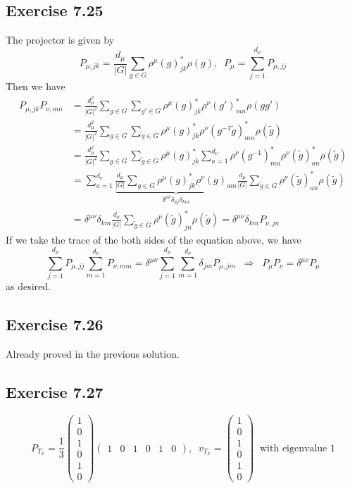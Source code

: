 \documentclass[]{ctexart}
\begin{document}
\subsection{Exercise 7.25} 
The projector is given by 
\begin{equation*}
P_{\mu,jk}=\frac{d_\mu}{|G|}\sum_{g\in G}\rho^\mu(g)^*_{jk}\rho(g),\;\;P_\mu=\sum_{j=1}^{d_\mu}P_{\mu,jj}
\end{equation*}
Then we have 
\begin{align*}
P_{\mu,jk}P_{\nu,mn}&=\frac{d_\mu^2}{|G|^2}\sum_{g\in G}\sum_{g'\in G}\rho^\mu(g)^*_{jk}\rho^\nu(g')^*_{mn}\rho(gg')\\
&=\frac{d_\mu^2}{|G|^2}\sum_{g\in G}\sum_{\tilde{g}\in G}\rho^\mu(g)^*_{jk}\rho^\nu(g^{-1}\tilde{g})^*_{mn}\rho(\tilde{g})\\
&=\frac{d_\mu^2}{|G|^2}\sum_{g\in G}\sum_{\tilde{g}\in G}\rho^\mu(g)^*_{jk}\sum_{a=1}^{d_\nu}\rho^\nu(g^{-1})^*_{ma}\rho^\nu(\tilde{g})^*_{an}\rho(\tilde{g})\\
&=\sum_{a=1}^{d_\nu}\underbrace{\frac{d_\mu}{|G|}\sum_{g\in G}\rho^\mu(g)^*_{jk}\rho^\nu(g)_{am}}_{\delta^{\mu\nu}\delta_{aj}\delta_{km}}\frac{d_\mu}{|G|}\sum_{\tilde{g}\in G}\rho^\nu(\tilde{g})^*_{an}\rho(\tilde{g})\\
&=\delta^{\mu\nu}\delta_{km}\frac{d_\mu}{|G|}\sum_{\tilde{g}\in G}\rho^\nu(\tilde{g})^*_{jn}\rho(\tilde{g})=\delta^{\mu\nu}\delta_{km}P_{\nu,jn}
\end{align*}
If we take the trace of the both sides of the equation above, we have 
\begin{equation*}
\sum_{j=1}^{d_\mu}P_{\mu,jj}\sum_{m=1}^{d_\nu}P_{\nu,mm}=\delta^{\mu\nu} \sum_{j=1}^{d_\mu}\sum_{m=1}^{d_\nu}\delta_{jm}P_{\mu,jm}\;\;\Rightarrow\;\;P_\mu P_\nu=\delta^{\mu\nu}P_\mu
\end{equation*}
as desired. 
\subsection{Exercise 7.26}
Already proved in the previous solution. 
\subsection{Exercise 7.27}
\begin{equation*}
P_{T_x}=\frac{1}{3}\begin{pmatrix}
1\\0\\1\\0\\1\\0
\end{pmatrix}\begin{pmatrix}
1 & 0 &1 & 0 & 1 & 0
\end{pmatrix},\;\;v_{T_x}=\begin{pmatrix}
1\\0\\1\\0\\1\\0
\end{pmatrix}\;\;\text{with eigenvalue 1}
\end{equation*}
\end{document}
